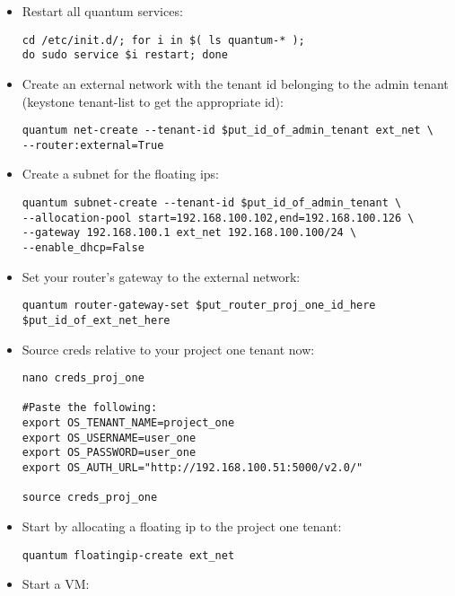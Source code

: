 \begin{itemize}
\item Restart all quantum services:

\begin{verbatim}
cd /etc/init.d/; for i in $( ls quantum-* ); 
do sudo service $i restart; done
\end{verbatim}


\item Create an external network with the tenant id belonging to the admin tenant (keystone tenant-list to get the appropriate id):

\begin{verbatim}
quantum net-create --tenant-id $put_id_of_admin_tenant ext_net \
--router:external=True
\end{verbatim}


\item Create a subnet for the floating ips:

\begin{verbatim}
quantum subnet-create --tenant-id $put_id_of_admin_tenant \
--allocation-pool start=192.168.100.102,end=192.168.100.126 \
--gateway 192.168.100.1 ext_net 192.168.100.100/24 \
--enable_dhcp=False
\end{verbatim}


\item Set your router's gateway to the external network:

\begin{verbatim}
quantum router-gateway-set $put_router_proj_one_id_here $put_id_of_ext_net_here
\end{verbatim}


\item Source creds relative to your project one tenant now:

\begin{verbatim}
nano creds_proj_one

#Paste the following:
export OS_TENANT_NAME=project_one
export OS_USERNAME=user_one
export OS_PASSWORD=user_one
export OS_AUTH_URL="http://192.168.100.51:5000/v2.0/"

source creds_proj_one
\end{verbatim}


\item Start by allocating a floating ip to the project one tenant:

\begin{verbatim}
quantum floatingip-create ext_net
\end{verbatim}


\item Start a VM:


\end{itemize}
